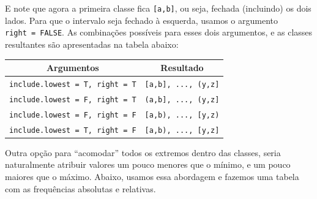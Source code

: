 \documentclass[
  10pt,
  a4paper]{book}
\begin{document}
E note que agora a primeira classe fica \texttt{{[}a,b{]}}, ou seja, fechada
(incluindo) os dois lados. Para que o intervalo seja fechado à esquerda,
usamos o argumento \texttt{right\ =\ FALSE}. As combinações possíveis para esses
dois argumentos, e as classes resultantes são apresentadas na tabela
abaixo:

\begin{longtable}[]{@{}cc@{}}
\toprule()
Argumentos & Resultado \\
\midrule()
\endhead
\texttt{include.lowest\ =\ T,\ right\ =\ T} & \texttt{{[}a,b{]},\ ...,\ (y,z{]}} \\
\texttt{include.lowest\ =\ F,\ right\ =\ T} & \texttt{(a,b{]},\ ...,\ (y,z{]}} \\
\texttt{include.lowest\ =\ F,\ right\ =\ F} & \texttt{{[}a,b),\ ...,\ {[}y,z)} \\
\texttt{include.lowest\ =\ T,\ right\ =\ F} & \texttt{{[}a,b),\ ...,\ {[}y,z{]}} \\
\bottomrule()
\end{longtable}

Outra opção para ``acomodar'' todos os extremos dentro das classes, seria
naturalmente atribuir valores um pouco menores que o mínimo, e um pouco
maiores que o máximo. Abaixo, usamos essa abordagem e fazemos uma tabela
com as frequências absolutas e relativas.
\end{document}
